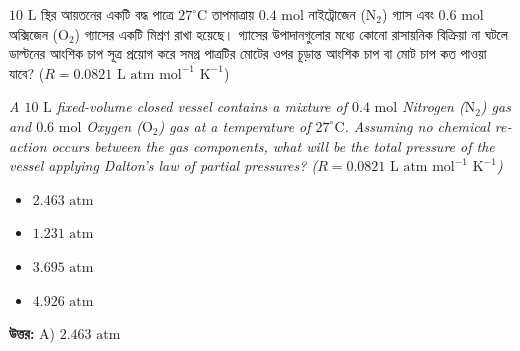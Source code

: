 \documentclass[12pt, a4paper]{article}
\begin{document}
\begin{tcolorbox}[questionbox={প্রশ্ন (Question) 18}]
    \noindent
    $10\text{ L}$ স্থির আয়তনের একটি বদ্ধ পাত্রে $27^\circ\text{C}$ তাপমাত্রায় $0.4\text{ mol}$ নাইট্রোজেন ($\text{N}_2$) গ্যাস এবং $0.6\text{ mol}$ অক্সিজেন ($\text{O}_2$) গ্যাসের একটি মিশ্রণ রাখা হয়েছে। গ্যাসের উপাদানগুলোর মধ্যে কোনো রাসায়নিক বিক্রিয়া না ঘটলে ডাল্টনের আংশিক চাপ সূত্র প্রয়োগ করে সমগ্র পাত্রটির মোটের ওপর চূড়ান্ত আংশিক চাপ বা মোট চাপ কত পাওয়া যাবে? ($R = 0.0821\text{ L atm mol}^{-1}\text{ K}^{-1}$)
    
    \vspace{0.8em}
    \begin{english}
    \noindent\textit{\color{darkgray}
    A $10\text{ L}$ fixed-volume closed vessel contains a mixture of $0.4\text{ mol}$ Nitrogen ($\text{N}_2$) gas and $0.6\text{ mol}$ Oxygen ($\text{O}_2$) gas at a temperature of $27^\circ\text{C}$. Assuming no chemical reaction occurs between the gas components, what will be the total pressure of the vessel applying Dalton's law of partial pressures? ($R = 0.0821\text{ L atm mol}^{-1}\text{ K}^{-1}$)
    }
    \end{english}
\end{tcolorbox}

\begin{itemize}[label={}, leftmargin=1cm, itemsep=0.5em]
    \item[\textbf{A)}] $2.463\text{ atm}$
    \item[\textbf{B)}] $1.231\text{ atm}$
    \item[\textbf{C)}] $3.695\text{ atm}$
    \item[\textbf{D)}] $4.926\text{ atm}$
\end{itemize}

\vspace{0.5em}
\begin{tcolorbox}[answerbox]
    \textbf{\color{success} উত্তর:} A) $2.463\text{ atm}$
\end{tcolorbox}
\vspace{1em}
\end{document}
